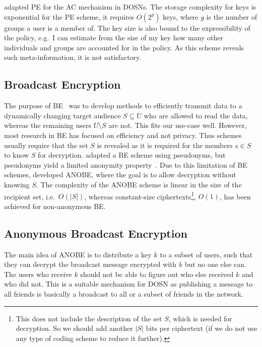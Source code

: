 \citet{PEAC} adapted \ac{PE} for the \ac{AC} mechanism in \acp{DOSN}.
The storage complexity for keys is exponential for the \ac{PE} scheme, it 
requires \(O(2^g)\) keys, where \(g\) is the number of groups a user is 
a member of.
The key size is also bound to the expressibility of the policy, e.g.\ I can 
estimate from the size of my key how many other individuals and groups are 
accounted for in the policy.
As this scheme reveals such meta-information, it is not satisfactory.

\subsection{Broadcast Encryption}\label{sec:BE}

The purpose of \ac{BE}~\cite{broadcastenc} was to develop methods to 
efficiently transmit data to a dynamically changing target audience 
\(S\subseteq U\) who are allowed to read the data, whereas the remaining users 
\(U\setminus S\) are not.
This fits our use-case well.
However, most research in \ac{BE} has focused on efficiency and not privacy.
Thus schemes usually require that the set \(S\) is revealed as it is required 
for the members \(s\in S\) to know \(S\) for decryption.
\citet{PseudonymousBE} adapted a \ac{BE} scheme using pseudonyms, but 
pseudonyms yield a limited anonymity property~\cite{PseudonymousBE}.
Due to this limitation of \ac{BE} schemes, \citet{ANOBE} developed \ac{ANOBE}, 
where the goal is to allow decryption without knowing \(S\).
The complexity of the \ac{ANOBE} scheme is linear in the size of the recipient 
set, i.e.~\(O(|S|)\), whereas constant-size ciphertexts\footnote{%
  This does not include the description of the set \(S\), which is needed for 
  decryption.
  So we should add another \(|S|\) bits per ciphertext (if we do not use any 
  type of coding scheme to reduce it further).
}, \(O(1)\), has been achieved for non-anonymous \ac{BE}.

\subsection{Anonymous Broadcast Encryption}\label{sec:ANOBE}

The main idea of \ac{ANOBE} is to distribute a key \(k\) to a subset of users, 
such that they can decrypt the broadcast message encrypted with \(k\) but no 
one else can.
The users who receive \(k\) should not be able to figure out who else received 
\(k\) and who did not.
This is a suitable mechanism for \ac{DOSN} as publishing a message to all 
friends is basically a broadcast to all or a subset of friends in the network.

